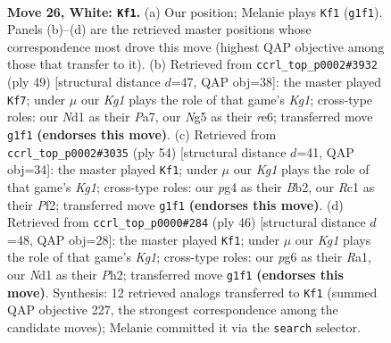 \documentclass[11pt]{article}
\begin{document}
\clearpage

\begin{figure}[p]\centering
\begin{subfigure}{0.46\textwidth}\centering
\resizebox{\linewidth}{!}{%
\newchessgame
\chessboard[
  setfen={1nb4r/6k1/1p2p1p1/1B2PpN1/6p1/8/r1P2PP1/2RN2K1 w - - 3 26},
  showmover=false,
  pgfstyle=straightmove, color=movearrow, markmove={g1-f1}
]}
\caption{}
\end{subfigure}\hfill
\begin{subfigure}{0.46\textwidth}\centering
\resizebox{\linewidth}{!}{%
\newchessgame
\chessboard[
  setfen={3r2k1/pp4p1/2p1R3/3p1n1p/P4P2/6P1/1PP2N1P/2K5 b - - 0 25},
  showmover=false,
  pgfstyle=straightmove, color=movearrow, markmove={g8-f7}
]}
\caption{}
\end{subfigure}
\\[4pt]
\begin{subfigure}{0.46\textwidth}\centering
\resizebox{\linewidth}{!}{%
\newchessgame
\chessboard[
  setfen={2r3k1/5p1p/p1P3pb/n3P3/Pp1N4/8/1B3PPP/3R2K1 w - - 3 28},
  showmover=false,
  pgfstyle=straightmove, color=movearrow, markmove={g1-f1}
]}
\caption{}
\end{subfigure}\hfill
\begin{subfigure}{0.46\textwidth}\centering
\resizebox{\linewidth}{!}{%
\newchessgame
\chessboard[
  setfen={2r2bk1/6pp/p3p3/1p6/4N3/PP1nB3/5PPP/R5K1 w - - 0 24},
  showmover=false,
  pgfstyle=straightmove, color=movearrow, markmove={g1-f1}
]}
\caption{}
\end{subfigure}
\caption{\textbf{Move 26, White: \texttt{Kf1}.} (a) Our position; Melanie plays \texttt{Kf1} (\texttt{g1f1}). Panels (b)--(d) are the retrieved master positions whose correspondence most drove this move (highest QAP objective among those that transfer to it). (b) Retrieved from \texttt{ccrl\_top\_p0002\#3932} (ply 49) [structural distance $d$=47, QAP obj=38]: the master played \texttt{Kf7}; under $\mu$ our \emph{Kg1} plays the role of that game's \emph{Kg1}; cross-type roles: our \emph{N}d1 as their \emph{P}a7, our \emph{N}g5 as their \emph{r}e6; transferred move \texttt{g1f1} \textbf{(endorses this move)}. (c) Retrieved from \texttt{ccrl\_top\_p0002\#3035} (ply 54) [structural distance $d$=41, QAP obj=34]: the master played \texttt{Kf1}; under $\mu$ our \emph{Kg1} plays the role of that game's \emph{Kg1}; cross-type roles: our \emph{p}g4 as their \emph{B}b2, our \emph{R}c1 as their \emph{P}f2; transferred move \texttt{g1f1} \textbf{(endorses this move)}. (d) Retrieved from \texttt{ccrl\_top\_p0000\#284} (ply 46) [structural distance $d$=48, QAP obj=28]: the master played \texttt{Kf1}; under $\mu$ our \emph{Kg1} plays the role of that game's \emph{Kg1}; cross-type roles: our \emph{p}g6 as their \emph{R}a1, our \emph{N}d1 as their \emph{P}h2; transferred move \texttt{g1f1} \textbf{(endorses this move)}. Synthesis: 12 retrieved analogs transferred to \texttt{Kf1} (summed QAP objective 227, the strongest correspondence among the candidate moves); Melanie committed it via the \texttt{search} selector.}
\label{fig:thought-m50}
\end{figure}
\end{document}
